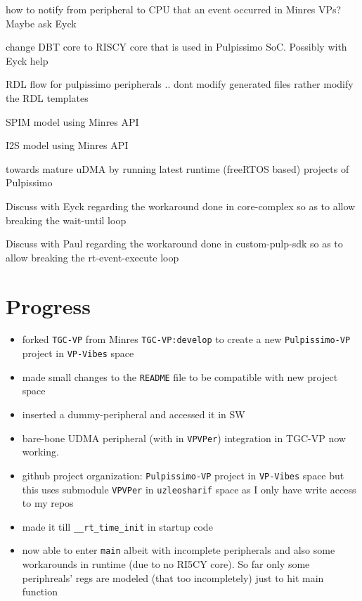 \documentclass{article}
\begin{document}
\begin{todolist}
 \item how to notify from peripheral to CPU that an event occurred in Minres VPs? Maybe ask Eyck
 \item change DBT core to RISCY core that is used in Pulpissimo SoC. Possibly with Eyck help
 \item RDL flow for pulpissimo peripherals .. dont modify generated files rather modify the RDL templates
 \item SPIM model using Minres API
 \item I2S model using Minres API
 \item towards mature uDMA by running latest runtime (freeRTOS based) projects of Pulpissimo
 \item Discuss with Eyck regarding the workaround done in core-complex so as to allow breaking the wait-until loop
 \item Discuss with Paul regarding the workaround done in custom-pulp-sdk so as to allow breaking the rt-event-execute loop
\end{todolist}

\section{Progress}
\begin{itemize}
 \item forked \texttt{TGC-VP} from Minres \texttt{TGC-VP:develop} to create a new \texttt{Pulpissimo-VP} project in
       \texttt{VP-Vibes} space
 \item made small changes to the \texttt{README} file to be compatible with new project space
 \item inserted a dummy-peripheral and accessed it in SW
 \item bare-bone UDMA peripheral (with in \texttt{VPVPer}) integration in TGC-VP now working.
 \item github project organization: \texttt{Pulpissimo-VP} project in \texttt{VP-Vibes} space but this uses
       submodule \texttt{VPVPer} in \texttt{uzleosharif} space as I only have write access to my repos
 \item made it till \texttt{\_\_rt\_time\_init} in startup code
 \item now able to enter \texttt{main} albeit with incomplete peripherals and also some workarounds in runtime (due to no RI5CY core). So far
       only some periphreals' regs are modeled (that too incompletely) just to hit main function
\end{itemize}
\end{document}
